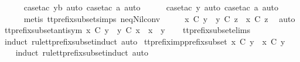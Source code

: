\begin{isabellebody}
\ \ \ \ \isamarkupfalse%
\ {\isacharparenleft}case{\isacharunderscore}tac\ yb{\isacharcomma}\ auto{\isacharcomma}\ case{\isacharunderscore}tac\ a{\isacharcomma}\ auto{\isacharparenright}\isanewline
\ \ \ \ \isamarkupfalse%
\ {\isacharparenleft}case{\isacharunderscore}tac\ y{\isacharcomma}\ auto{\isacharcomma}\ case{\isacharunderscore}tac\ a{\isacharcomma}\ auto{\isacharparenright}{\isacharplus}\isanewline
\ \ \ \ \isamarkupfalse%
\ {\isacharparenleft}metis\ tt{\isacharunderscore}prefix{\isacharunderscore}subset{\isachardot}simps{\isacharparenleft}{}{\isacharparenright}\ neq{\isacharunderscore}Nil{\isacharunderscore}conv{\isacharparenright}\isanewline
\ \ \isamarkupfalse%
\ \isamarkupfalse%
\ {\isachardoublequoteopen}x\ {\isasymlesssim}\isactrlsub C\ y\ {\isasymLongrightarrow}\ y\ {\isasymlesssim}\isactrlsub C\ z\ {\isasymLongrightarrow}\ x\ {\isasymlesssim}\isactrlsub C\ z{\isachardoublequoteclose}\ \isamarkupfalse%
\ auto\isanewline
{}\isamarkupfalse%
%
\endisatagproof
{\isafoldproof}%
%
\isadelimproof
\isanewline
%
\endisadelimproof
\isanewline
{}\isamarkupfalse%
\ tt{\isacharunderscore}prefix{\isacharunderscore}subset{\isacharunderscore}antisym{\isacharcolon}\ {\isachardoublequoteopen}x\ {\isasymlesssim}\isactrlsub C\ y\ {\isasymLongrightarrow}\ y\ {\isasymlesssim}\isactrlsub C\ x\ {\isasymLongrightarrow}\ x\ {\isacharequal}\ y{\isachardoublequoteclose}\isanewline
%
\isadelimproof
\ \ %
\endisadelimproof
%
\isatagproof
{}\isamarkupfalse%
\ tt{\isacharunderscore}prefix{\isacharunderscore}subset{\isachardot}elims{\isacharparenleft}{}{\isacharparenright}\ \isamarkupfalse%
\ {\isacharparenleft}induct\ rule{\isacharcolon}tt{\isacharunderscore}prefix{\isacharunderscore}subset{\isachardot}induct{\isacharcomma}\ auto{\isacharparenright}%
\endisatagproof
{\isafoldproof}%
%
\isadelimproof
\isanewline
%
\endisadelimproof
\isanewline
{}\isamarkupfalse%
\ tt{\isacharunderscore}prefix{\isacharunderscore}imp{\isacharunderscore}prefix{\isacharunderscore}subset{\isacharcolon}\ {\isachardoublequoteopen}x\ {\isasymle}\isactrlsub C\ y\ {\isasymLongrightarrow}\ x\ {\isasymlesssim}\isactrlsub C\ y{\isachardoublequoteclose}\isanewline
%
\isadelimproof
\ \ %
\endisadelimproof
%
\isatagproof
{}\isamarkupfalse%
\ {\isacharparenleft}induct\ rule{\isacharcolon}tt{\isacharunderscore}prefix{\isacharunderscore}subset{\isachardot}induct{\isacharcomma}\ auto{\isacharparenright}%

\end{isabellebody}
